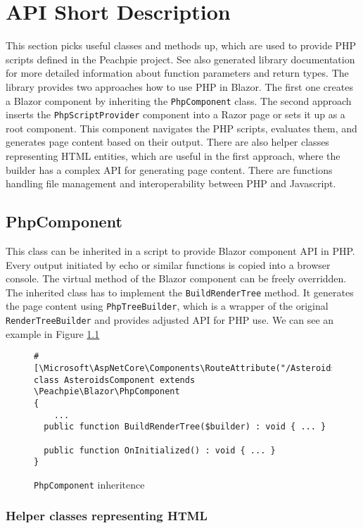 \chapter{API Short Description}

This section picks useful classes and methods up, which are used to provide PHP scripts defined in the Peachpie project.
See also generated library documentation for more detailed information about function parameters and return types.
The library provides two approaches how to use PHP in Blazor. 
The first one creates a Blazor component by inheriting the \texttt{PhpComponent} class. 
The second approach inserts the \texttt{PhpScriptProvider} component into a Razor page or sets it up as a root component. 
This component navigates the PHP scripts, evaluates them, and generates page content based on their output. 
There are also helper classes representing HTML entities, which are useful in the first approach, where the builder has a complex API for generating page content. There are functions handling file management and interoperability between PHP and Javascript.

\section{PhpComponent}

This class can be inherited in a script to provide Blazor component API in PHP. Every output initiated by echo or similar functions is copied into a browser console. The virtual method of the Blazor component can be freely overridden. The inherited class has to implement the \texttt{BuildRenderTree} method. It generates the page content using \texttt{PhpTreeBuilder}, which is a wrapper of the original \texttt{RenderTreeBuilder} and provides adjusted API for PHP use.
We can see an example in Figure \ref{img35:inheritance}
\par
\begin{figure}
\begin{lstlisting}
#[\Microsoft\AspNetCore\Components\RouteAttribute("/Asteroids")]
class AsteroidsComponent extends \Peachpie\Blazor\PhpComponent
{  
	...
  public function BuildRenderTree($builder) : void { ... }

  public function OnInitialized() : void { ... }
}
\end{lstlisting}
\caption{\texttt{PhpComponent} inheritence}
\label{img35:inheritance}
\end{figure}

\subsection{Helper classes representing HTML}

